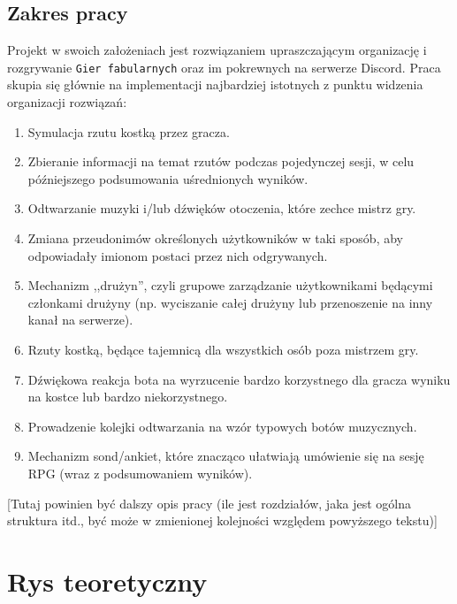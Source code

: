 \documentclass[shortabstract,inz]{iithesis}
\begin{document}
		\section*{Zakres pracy}
		Projekt w swoich założeniach jest rozwiązaniem upraszczającym organizację i rozgrywanie \texttt{Gier fabularnych} oraz im pokrewnych na serwerze Discord. Praca skupia się głównie na implementacji najbardziej istotnych z punktu widzenia organizacji rozwiązań:
		\begin{enumerate}
			\item Symulacja rzutu kostką przez gracza.
			\item Zbieranie informacji na temat rzutów podczas pojedynczej sesji, w celu późniejszego podsumowania uśrednionych wyników.
			\item Odtwarzanie muzyki i/lub dźwięków otoczenia, które zechce mistrz gry.
			\item Zmiana przeudonimów określonych użytkowników w taki sposób, aby odpowiadały imionom postaci przez nich odgrywanych.
			\item Mechanizm ,,drużyn'', czyli grupowe zarządzanie użytkownikami będącymi członkami drużyny (np. wyciszanie całej drużyny lub przenoszenie na inny kanał na serwerze).
			\item Rzuty kostką, będące tajemnicą dla wszystkich osób poza mistrzem gry.
			\item Dźwiękowa reakcja bota na wyrzucenie bardzo korzystnego dla gracza wyniku na kostce lub bardzo niekorzystnego.
			\item Prowadzenie kolejki odtwarzania na wzór typowych botów muzycznych.
			\item Mechanizm sond/ankiet, które znacząco ułatwiają umówienie się na sesję RPG (wraz z podsumowaniem wyników).
		\end{enumerate}
	
		
		
		[Tutaj powinien być dalszy opis pracy (ile jest rozdziałów, jaka jest ogólna struktura itd., być może w zmienionej kolejności względem powyższego tekstu)]
		
	\chapter{Rys teoretyczny}
\end{document}
